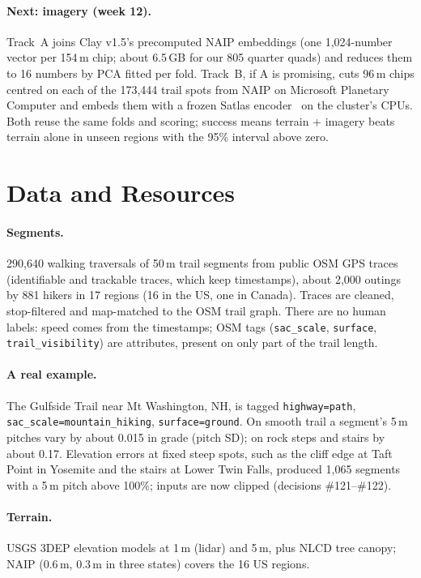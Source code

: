 \documentclass[10pt,twocolumn,letterpaper]{article}
\begin{document}
\paragraph{Next: imagery (week 12).} Track~A joins Clay v1.5's precomputed NAIP embeddings (one 1{,}024-number vector per 154\,m chip; about 6.5\,GB for our 805 quarter quads) and reduces them to 16 numbers by PCA fitted per fold. Track~B, if A is promising, cuts 96\,m chips centred on each of the 173{,}444 trail spots from NAIP on Microsoft Planetary Computer and embeds them with a frozen Satlas encoder~\cite{bastani2023satlaspretrain} on the cluster's CPUs. Both reuse the same folds and scoring; success means terrain + imagery beats terrain alone in unseen regions with the 95\% interval above zero.

\section{Data and Resources}
\label{sec:data}

\paragraph{Segments.} 290{,}640 walking traversals of 50\,m trail segments from public OSM GPS traces (identifiable and trackable traces, which keep timestamps), about 2{,}000 outings by 881 hikers in 17 regions (16 in the US, one in Canada). Traces are cleaned, stop-filtered and map-matched to the OSM trail graph. There are no human labels: speed comes from the timestamps; OSM tags (\texttt{sac\_scale}, \texttt{surface}, \texttt{trail\_visibility}) are attributes, present on only part of the trail length.

\paragraph{A real example.} The Gulfside Trail near Mt Washington, NH, is tagged \texttt{highway=path}, \texttt{sac\_scale=mountain\_hiking}, \texttt{surface=ground}. On smooth trail a segment's 5\,m pitches vary by about 0.015 in grade (pitch SD); on rock steps and stairs by about 0.17. Elevation errors at fixed steep spots, such as the cliff edge at Taft Point in Yosemite and the stairs at Lower Twin Falls, produced 1{,}065 segments with a 5\,m pitch above 100\%; inputs are now clipped (decisions \#121--\#122).

\paragraph{Terrain.} USGS 3DEP elevation models at 1\,m (lidar) and 5\,m, plus NLCD tree canopy; NAIP (0.6\,m, 0.3\,m in three states) covers the 16 US regions.
\end{document}
